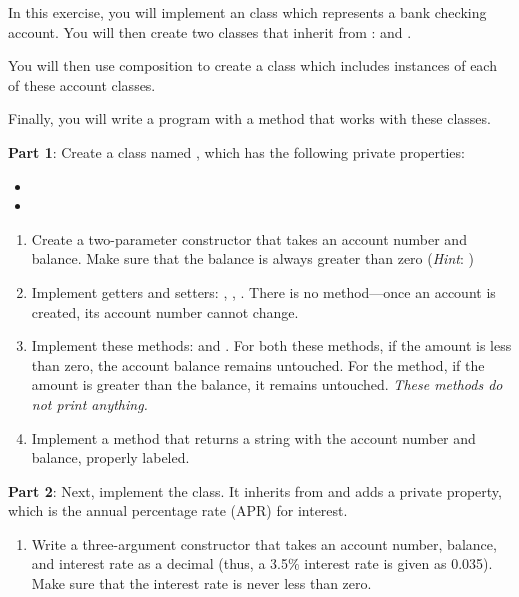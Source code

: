 \begin{exercise}
\label{ex.AccountInheritance}
In this exercise, you will implement an  class which represents a bank checking account. You will then create two classes that inherit from :  and .

You will then use composition to create a  class which includes instances of each of these account classes.

Finally, you will write a program with a  method that works with these classes.

{\bf Part 1}: Create a class named , which has the following private properties:

\begin{itemize}
    \item {}
    \item {}
\end{itemize}

\begin{enumerate}
\item Create a two-parameter constructor that takes an account number and balance. Make sure that the balance is always greater than zero ({\em Hint}: )

\item Implement getters and setters: , , . There is no  method---once an account is created, its account number cannot change.

\item Implement these methods:  and . For both these methods, if the amount is less than zero, the account balance remains untouched. For the  method, if the amount is greater than the balance, it remains untouched. {\em These methods do not print anything.}

\item Implement a  method that returns a string with the account number and balance, properly labeled.
\end{enumerate}

{\bf Part 2}: Next, implement the  class. It inherits from  and adds a private  property, which is the annual percentage rate (APR) for interest.

\begin{enumerate}
\item Write a three-argument constructor that takes an account number, balance, and interest rate as a decimal (thus, a 3.5\% interest rate is given as 0.035). Make sure that the interest rate is never less than zero.


\end{enumerate}
\end{exercise}
